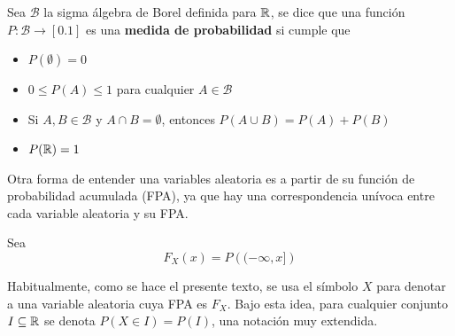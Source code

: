 \begin{definicion}
Sea $\mathcal{B}$ la sigma álgebra de Borel definida para $\mathbb{R}$, se dice que una función
$P : \mathcal{B} \rightarrow [0.1]$ es una \textbf{medida de probabilidad} si cumple que
\begin{itemize}
\item $P(\emptyset) = 0$
\item $0 \leq P(A) \leq 1$ para cualquier $A \in \mathcal{B}$
\item Si $A, B \in \mathcal{B}$ y $A\cap B = \emptyset$, entonces $P(A \cup B) = P(A) + P(B)$ 
\item $P(\mathbb{R}) = 1$
\end{itemize}
\label{variable_aleatoria}
\end{definicion}


Otra forma de entender una variables aleatoria es a partir de su función de probabilidad
acumulada (FPA), ya que hay una correspondencia unívoca entre cada variable aleatoria y su FPA.

\begin{definicion}
Sea 
\begin{equation*}
F_X (x) = P\left( (-\infty,x] \right)
\end{equation*}
\end{definicion}

Habitualmente, como se hace el presente texto, se usa el símbolo $X$ para denotar a una variable 
aleatoria cuya FPA es $F_X$. Bajo esta idea, para cualquier conjunto $I \subseteq \mathbb{R}$ se denota
$P(X \in I) = P(I)$, una notación muy extendida.




